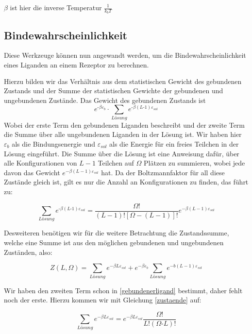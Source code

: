 \documentclass[bachelor,       %
               twoside,        %
               BCOR10mm,       %
               english,ngerman, %
               ]{GAUBM}
\begin{document}
$\beta$ ist hier die inverse Temperatur $\frac{1}{k_bT}$

\subsection{Bindewahrscheinlichkeit}
Diese Werkzeuge können nun angewandt werden, um die Bindewahrscheinlichkeit eines
Liganden an einem Rezeptor zu berechnen.

Hierzu bilden wir das Verhältnis aus dem statistischen Gewicht des gebundenen
Zustands und der Summe der statistischen Gewichte der gebundenen und ungebundenen
Zustände. Das Gewicht des gebundenen Zustands ist
$$e^{\text{-}\beta\varepsilon_b} \cdot \sum_{Lösung}e^{\text{-}\beta(L\text{-}1)\varepsilon_{sol}}$$
Wobei der erste Term den gebundenen Liganden beschreibt und der zweite Term die Summe
über alle ungebundenen Liganden in der Lösung ist. Wir haben hier $\varepsilon_b$ als
die Bindungsenergie und $\varepsilon_{sol}$ als die Energie für ein freies Teilchen
in der Lösung eingeführt. Die Summe über die Lösung ist eine Anweisung dafür,
über alle Konfigurationen von $L-1$ Teilchen auf $\Omega$ Plätzen zu summieren,
wobei jede davon das Gewicht $e^{-\beta(L-1)\varepsilon_{sol}}$ hat.
Da der Boltzmannfaktor für all diese Zustände gleich ist, gilt es nur
die Anzahl an Konfigurationen zu finden, das führt zu:

\begin{equation}
\label{gebundenerligand}
\sum_{Lösung}e^{\text{-}\beta(L\text{-}1)\varepsilon_{sol}} = \frac{\Omega!}{(L-1)![\Omega-(L-1)]!}e^{-\beta(L-1)\varepsilon_{sol}}
\end{equation}

Desweiteren benötigen wir für die weitere Betrachtung die Zustandssumme,
welche eine Summe ist aus den möglichen gebundenen und ungebundenen Zuständen, also:

\begin{equation}
Z(L,\Omega) = \sum_{Lösung}e^{-\beta L\varepsilon_{sol}} + e^{-\beta\varepsilon_b}\sum_{Lösung}e^{-b(L-1)\varepsilon_{sol}}
\end{equation}

Wir haben den zweiten Term schon in \ref{gebundenerligand} bestimmt, daher fehlt noch der erste.
Hierzu kommen wir mit Gleichung \ref{zustaende} auf:

\begin{equation}
\sum_{Lösung}e^{-\beta L\varepsilon_{sol}} = e^{-\beta L\varepsilon_{sol}}\frac{\Omega!}{L!(\Omega\text{-}L)!}
\end{equation}
\end{document}
